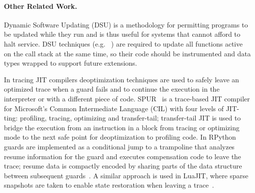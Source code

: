 \paragraph{Other Related Work.}
\ifdefined \fullver
Dynamic Software Updating (DSU) is a methodology for permitting programs to be updated while they run and is thus useful for systems that cannot afford to halt service. DSU techniques (e.g. ~\cite{neamtiu2006dsu,makris2009dsu}) are required to update all functions active on the call stack at the same time, so their code should be instrumented and data types wrapped to support future extensions.

\fi
In tracing JIT compilers deoptimization techniques are used to safely leave an optimized trace when a guard fails and to continue the execution in the interpreter or with a different piece of code. SPUR~\cite{bebenita2010spur} is a trace-based JIT compiler for Microsoft's Common Intermediate Language (CIL) with four levels of JIT-ting: profiling, tracing, optimizing and transfer-tail; transfer-tail JIT is used to bridge the execution from an instruction in a block from tracing or optimizing mode to the next safe point for deoptimization to profiling code. In RPython guards are implemented as a conditional jump to a trampoline that analyzes resume information for the guard and executes compensation code to leave the trace; resume data is compactly encoded by sharing parts of the data structure between subsequent guards~\cite{schneider2012rpython}. A similar approach is used in LuaJIT, where sparse snapshots are taken to enable state restoration when leaving a trace~\cite{luajit}.


